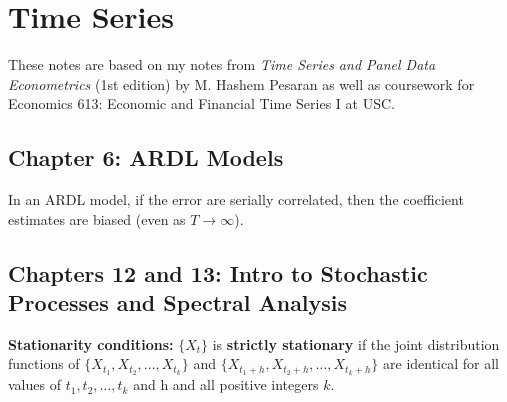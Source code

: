 %
%
%
%
%
%
%
%
%
%
%
%
%

\chapter{Time Series}

These notes are based on my notes from \textit{Time Series and Panel Data Econometrics} (1st edition) by M. Hashem Pesaran \citep{pesaran-2015-text} as well as coursework for Economics 613: Economic and Financial Time Series I at USC.

\section{Chapter 6: ARDL Models}

In an ARDL model, if the error are serially correlated, then the coefficient estimates are biased (even as \(T \to \infty\)).


\section{Chapters 12 and 13: Intro to Stochastic Processes and Spectral Analysis}

\textbf{Stationarity conditions:} \( \{X_t\} \) is \textbf{strictly stationary} if the joint distribution functions of \( \{ X_{t_1}, X_{t_2}, \ldots, X_{t_k}\} \) and \( \{ X_{t_1+h}, X_{t_2+h}, \ldots, X_{t_k+h}\} \) are identical for all values of \(t_1,  t_2, \ldots, t_k\) and h and all positive integers \(k\). 

